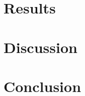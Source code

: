 \documentclass{article} %
\begin{document}
\begin{multicols}{2}
\section{Results}
\label{results}

\section{Discussion}
\label{discussion}

\section{Conclusion}
\label{conclusion}

\label{last_page}

\end{multicols}  %

\newpage


\end{document}
